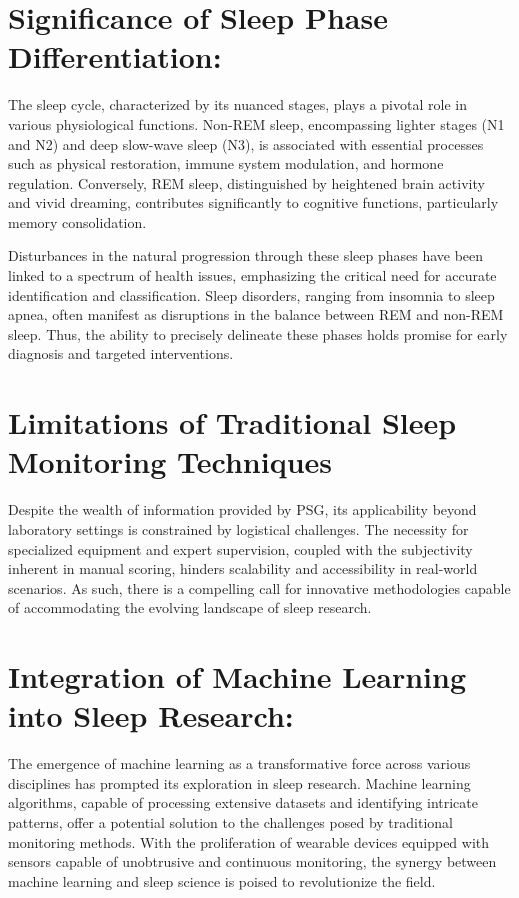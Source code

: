 \documentclass[12pt, a4paper,oneside]{book}
\numberwithin{equation}{section}
\begin{document}
\section{Significance of Sleep Phase Differentiation:}\label{sec:1.1}
The sleep cycle, characterized by its nuanced stages, plays a pivotal role in various physiological functions. Non-REM sleep, encompassing lighter stages (N1 and N2) and deep slow-wave sleep (N3), is associated with essential processes such as physical restoration, immune system modulation, and hormone regulation. Conversely, REM sleep, distinguished by heightened brain activity and vivid dreaming, contributes significantly to cognitive functions, particularly memory consolidation.

Disturbances in the natural progression through these sleep phases have been linked to a spectrum of health issues, emphasizing the critical need for accurate identification and classification. Sleep disorders, ranging from insomnia to sleep apnea, often manifest as disruptions in the balance between REM and non-REM sleep. Thus, the ability to precisely delineate these phases holds promise for early diagnosis and targeted interventions.

\section{Limitations of Traditional Sleep Monitoring Techniques}\label{sec:1.2}

 Despite the wealth of information provided by PSG, its applicability beyond laboratory settings is constrained by logistical challenges. The necessity for specialized equipment and expert supervision, coupled with the subjectivity inherent in manual scoring, hinders scalability and accessibility in real-world scenarios. As such, there is a compelling call for innovative methodologies capable of accommodating the evolving landscape of sleep research.


\section{Integration of Machine Learning into Sleep Research:}\label{sec:1.3}

The emergence of machine learning as a transformative force across various disciplines has prompted its exploration in sleep research. Machine learning algorithms, capable of processing extensive datasets and identifying intricate patterns, offer a potential solution to the challenges posed by traditional monitoring methods. With the proliferation of wearable devices equipped with sensors capable of unobtrusive and continuous monitoring, the synergy between machine learning and sleep science is poised to revolutionize the field.
\end{document}
